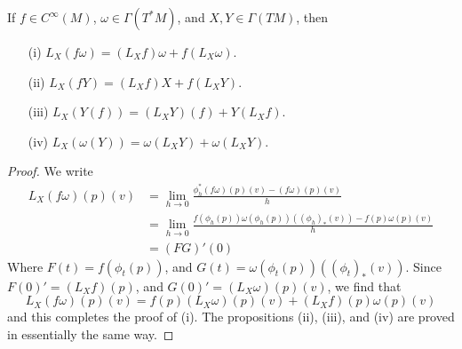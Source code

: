 \begin{theorem}
    If $f \in C^\infty(M)$, $\omega \in \Gamma(T^*M)$, and $X,Y \in \Gamma(TM)$, then
    \begin{itemize}
        \item[(i)] $L_X(f \omega) = (L_X f) \omega + f (L_X \omega)$.
        \item[(ii)] $L_X(f Y) = (L_X f) X + f (L_X Y)$.
        \item[(iii)] $L_X(Y(f)) = (L_X Y)(f) + Y(L_X f)$.
        \item[(iv)] $L_X(\omega(Y)) = \omega(L_X Y) + \omega(L_X Y)$.
    \end{itemize}
\end{theorem}
\begin{proof}
    We write
    \begin{align*}
        L_X(f \omega)(p)(v) &= \lim_{h \to 0} \frac{\phi_h^*(f \omega)(p)(v) - (f \omega)(p)(v)}{h}\\
        &= \lim_{h \to 0} \frac{f(\phi_h(p)) \omega(\phi_h(p))((\phi_h)_*(v)) - f(p) \omega(p)(v)}{h}\\
        &= (FG)'(0)
    \end{align*}
    Where $F(t) = f(\phi_t(p))$, and $G(t) = \omega(\phi_t(p))((\phi_t)_*(v))$. Since $F(0)' = (L_X f)(p)$, and $G(0)' = (L_X \omega)(p)(v)$, we find that
    \[ L_X(f \omega)(p)(v) = f(p) (L_X \omega)(p)(v) + (L_X f)(p) \omega(p)(v) \]
    and this completes the proof of (i). The propositions (ii), (iii), and (iv) are proved in essentially the same way.
\end{proof}

